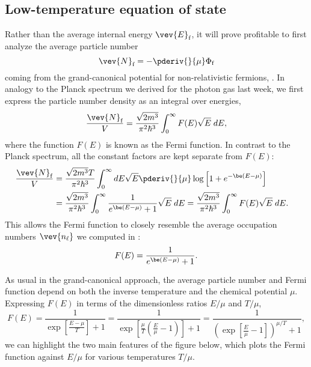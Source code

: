 \subsection{Low-temperature equation of state}
Rather than the average internal energy $\vev{E}_{\text{f}}$, it will prove profitable to first analyze the average particle number
\begin{equation*}
  \vev{N}_{\text{f}} = -\pderiv{}{\mu} \Phi_{\text{f}}
\end{equation*}
coming from the grand-canonical potential for non-relativistic fermions, .
In analogy to the Planck spectrum we derived for the photon gas last week, we first express the particle number density as an integral over energies,
\begin{equation*}
  \frac{\vev{N}_{\text{f}}}{V} = \frac{\sqrt{2m^3}}{\pi^2 \hbar^3} \int_0^{\infty} F(E) \sqrt{E} \; dE,
\end{equation*}
where the function $F(E)$ is known as the Fermi function.
In contrast to the Planck spectrum, all the constant factors are kept separate from $F(E)$:
\begin{align}
  \frac{\vev{N}_{\text{f}}}{V} & = \frac{\sqrt{2m^3} T}{\pi^2 \hbar^3} \int_0^{\infty} dE \sqrt{E} \pderiv{}{\mu} \log\left[1 + e^{-\be(E - \mu)}\right] \cr
                               & = \frac{\sqrt{2m^3}}{\pi^2 \hbar^3} \int_0^{\infty} \frac{1}{e^{\be(E - \mu)} + 1} \sqrt{E} \; dE = \frac{\sqrt{2m^3}}{\pi^2 \hbar^3} \int_0^{\infty} F(E) \sqrt{E} \; dE. \label{eq:N_fermi}
\end{align}
This allows the Fermi function to closely resemble the average occupation numbers $\vev{n_{\ell}}$ we computed in :
\begin{equation}
  \label{eq:Fermi_func}
  F(E) = \frac{1}{e^{\be(E - \mu)} + 1}.
\end{equation}

As usual in the grand-canonical approach, the average particle number and Fermi function depend on both the inverse temperature \be and the chemical potential $\mu$.
Expressing $F(E)$ in terms of the dimensionless ratios $E / \mu$ and $T / \mu$,
\begin{equation*}
  F(E) = \frac{1}{\exp\left[\frac{E - \mu}{T}\right] + 1} = \frac{1}{\exp\left[\frac{\mu}{T}\left(\frac{E}{\mu} - 1\right)\right] + 1} = \frac{1}{\left(\exp\left[\frac{E}{\mu} - 1\right]\right)^{\mu / T} + 1},
\end{equation*}
we can highlight the two main features of the figure below, which plots the Fermi function against $E / \mu$ for various temperatures $T / \mu$.

